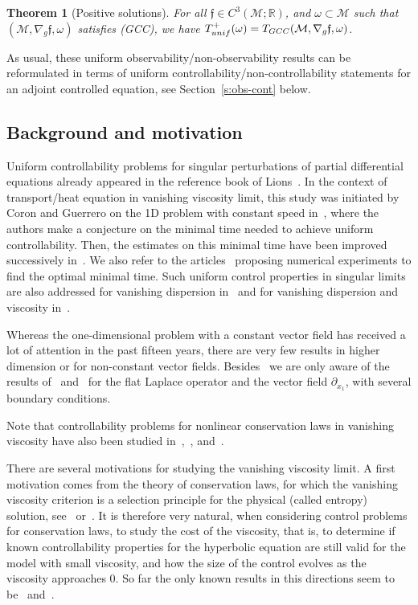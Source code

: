 \documentclass[11pt]{article}
\numberwithin{equation}{section}
\newcommand{\GCC}{\textup{GCC}}
\newcommand{\pGCC}{\textup{(GCC)}\xspace}
\newcommand{\unif}{\textup{unif}}
\newtheorem{theorem}[lemma]{Theorem}
\theoremstyle{definition}
\newcommand{\M}{\ensuremath{\mathcal M}}
\newcommand{\mb}[1]{\ensuremath{\mathbb{#1}}}
\newcommand{\R}{{\mb{R}}}
\newcommand{\f}{\ensuremath{\mathfrak{f}}}
\let\d\partial
\begin{document}
\begin{theorem}[Positive solutions]
\label{t:positive-intro}
For all $\f \in C^3(\M;\R)$, and $\omega \subset \M$ such that $(\M,\nabla_g\f,\omega)$ satisfies \pGCC, we have $T_{\unif}^+(\omega) = T_{\GCC}(\M,\nabla_g\f,\omega)$.
\end{theorem}

As usual, these uniform observability/non-observability results can be reformulated in terms of uniform controllability/non-controllability statements for an adjoint controlled equation, see Section~\ref{s:obs-cont} below.

\subsection{Background and motivation}
\label{s:motiv}
Uniform controllability problems for singular perturbations of partial differential equations already appeared in the reference book of Lions~\cite[Chap.\,3]{Lio2:88}. In the context of transport/heat equation in vanishing viscosity limit, this study was initiated by Coron and Guerrero on the 1D problem with constant speed in~\cite{CG:05}, where the authors make a conjecture on the minimal time needed to achieve uniform controllability. Then, the estimates on this minimal time have been improved successively in~\cite{Gla:10,Lissy:12,Lissy:14,Lissy:15}.
We also refer to the arti\-cles~\cite{Munch:18,YM:19,YM:19bis} proposing numerical experiments to find the optimal minimal time.
Such uniform control properties in singular limits are also addressed for vanishing dispersion in~\cite{GG:08} and for vanishing dispersion and viscosity in~\cite{GG:09}.

Whereas the one-dimensional problem with a constant vector field has received a lot of attention in the past fifteen years, there are very few results in higher dimension or for non-constant vector fields. Besides~\cite{GL:07} we are only aware of the results of~\cite{Barcena:20} and~\cite{Barcena:21} for the flat Laplace operator and the vector field $\d_{x_1}$, with several boundary conditions.

Note that controllability problems for nonlinear conservation laws in vanishing viscosity have also been studied in~\cite{GG:07},~\cite{Lea:11}, and~\cite{Marbach:14}.

There are several motivations for studying the vanishing viscosity limit.
A first motivation comes from the theory of conservation laws, for which the vanishing viscosity criterion is a selection principle for the physical (called entropy) solution, see~\cite{Kru:70} or~\cite[Chap.\,6]{Daf:00}.
It is therefore very natural, when considering control problems for conservation laws, to study the cost of the viscosity,
that is, to determine if known controllability properties for the hyperbolic equation are still valid for the model with
small viscosity, and how the size of the control evolves as the viscosity approaches $0$. So far the only known results in this directions seem to be~\cite{GG:07} and~\cite{Lea:11}.
\end{document}
